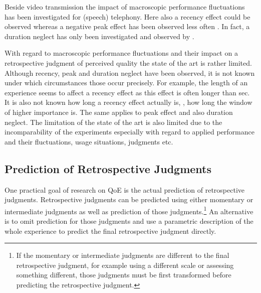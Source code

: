 Beside video transmission the impact of macroscopic performance fluctuations has been investigated for (speech) telephony. %
Here also a recency effect could be observed \citep[\cf,][]{rosenbluth_testing_1998, hamberg_time-varying_1999, gros_instantaneous_2001, gros_effects_2004, belmudez_assessment_2014, weiss_modeling_2009, lewcio_management_2012} whereas a negative peak effect has been observed less often \citep{weiss_modeling_2009, belmudez_assessment_2014, lewcio_management_2012}.
In fact, a duration neglect has only been investigated and observed by \citet{rosenbluth_testing_1998}.

With regard to macroscopic performance fluctuations and their impact on a retrospective judgment of perceived quality the state of the art is rather limited.
Although recency, peak and duration neglect have been observed, it is not known under which circumstances those occur precisely.
For example, the length of an experience seems to affect a recency effect as this effect is often longer than \unit[30]{sec}.
It is also not known how long a recency effect actually is, \ie, how long the window of higher importance is.
The same applies to peak effect and also duration neglect.
The limitation of the state of the art is also limited due to the incomparability of the experiments especially with regard to applied performance and their fluctuations, usage situations, judgments etc.


\subsection{Prediction of Retrospective Judgments}
One practical goal of research on \ac{QoE} is the actual prediction of retrospective judgments.
Retrospective judgments can be predicted using either momentary or intermediate judgments as well as prediction of those judgments.\footnote{If the momentary or intermediate judgments are different to the final retrospective judgment, for example using a different scale or assessing something different, those judgments must be first transformed before predicting the retrospective judgment.}
An alternative is to omit prediction for those judgments and use a parametric description of the whole experience to predict the final retrospective judgment directly.


